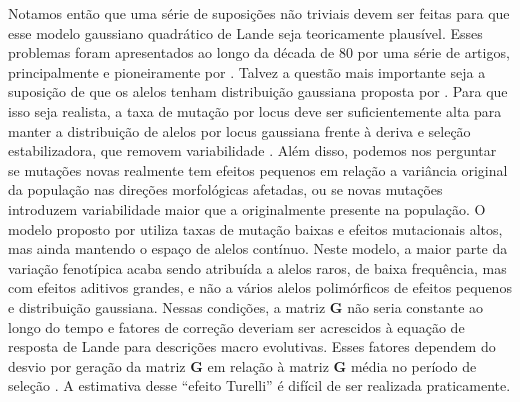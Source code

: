 Notamos então que uma série de suposições não triviais devem ser feitas
para que esse modelo gaussiano quadrático de Lande seja teoricamente
plausível.
Esses problemas foram apresentados ao longo da década de 80 por uma
série de artigos, principalmente e pioneiramente por \cite{Turelli1984,
Turelli1985, Turelli1986, Barton1987, Barton1989}.
Talvez a questão mais importante seja a suposição de que os alelos
tenham distribuição gaussiana proposta por \cite{Kimura1965}.
Para que isso seja realista, a taxa de mutação por locus deve ser
suficientemente alta para manter a distribuição de alelos por locus
gaussiana frente à deriva e seleção estabilizadora, que removem
variabilidade \citep{Falconer1996}.
Além disso, podemos nos perguntar se mutações novas realmente tem efeitos
pequenos em relação a variância original da população nas direções
morfológicas afetadas, ou se novas mutações introduzem variabilidade
maior que a originalmente presente na população.
O modelo proposto por \cite{Turelli1984} utiliza taxas de mutação
baixas e efeitos mutacionais altos, mas ainda mantendo o espaço de
alelos contínuo.
Neste modelo, a maior parte da variação fenotípica acaba sendo atribuída
a alelos raros, de baixa frequência, mas com efeitos aditivos grandes, e
não a vários alelos polimórficos de efeitos pequenos e distribuição
gaussiana.
Nessas condições, a matriz $\mathbf{G}$ não seria constante ao longo do tempo e
fatores de correção deveriam ser acrescidos à equação de resposta de
Lande para descrições macro evolutivas.
Esses fatores dependem do desvio por geração da matriz $\mathbf{G}$ em relação à
matriz $\mathbf{G}$ média no período de seleção \citep{Jones2004}.
A estimativa desse ``efeito Turelli'' é difícil de ser realizada
praticamente.

